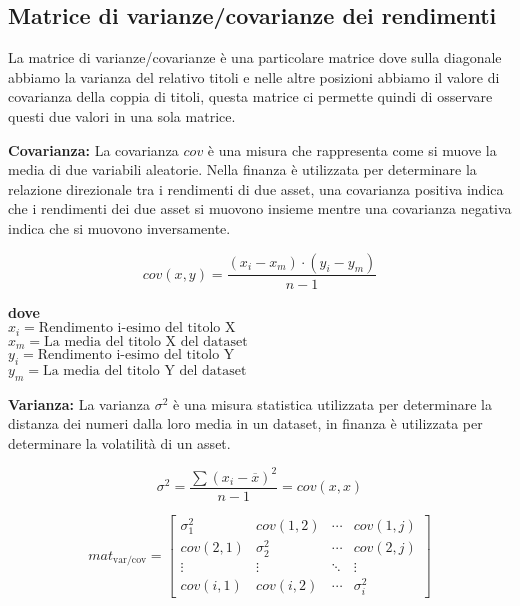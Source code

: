 \pagebreak


\subsection{Matrice di varianze/covarianze dei rendimenti}

La matrice di varianze/covarianze è una particolare matrice dove sulla diagonale abbiamo la varianza del relativo titoli e nelle altre posizioni abbiamo il valore di covarianza
della coppia di titoli, questa matrice ci permette quindi di osservare questi due valori in una sola matrice.

\textbf{Covarianza:} La covarianza \(cov\) è una misura che rappresenta come si muove la media di due variabili aleatorie. Nella finanza è utilizzata per determinare la relazione direzionale
tra i rendimenti di due asset, una covarianza positiva indica che i rendimenti dei due asset si muovono insieme mentre una covarianza negativa indica che si muovono inversamente.

\begin{displaymath}
  cov(x,y) = \frac{(x_i - x_m) \cdot (y_i - y_m)}{n - 1}
\end{displaymath}

\textbf{dove}\\
\(x_i = \text{Rendimento i-esimo del titolo X}\)\\
\(x_m = \text{La media del titolo X del dataset}\)\\
\(y_i = \text{Rendimento i-esimo del titolo Y}\)\\
\(y_m = \text{La media del titolo Y del dataset}\)

\textbf{Varianza:} La varianza \(\sigma^2\) è una misura statistica utilizzata per determinare la distanza dei numeri dalla loro media in un dataset, in finanza è utilizzata
per determinare la volatilità di un asset.

\begin{displaymath}
  \sigma^2 = \frac{\sum(x_i - \overline{x})^2}{n - 1}  = cov(x,x)
\end{displaymath}

\begin{displaymath}
  mat_{\text{var/cov}} = 
\begin{bmatrix}
  \sigma^2_1 & cov(1,2) & \cdots & cov(1,j)\\
  cov(2,1) & \sigma^2_2 & \cdots & cov(2,j)\\
  \vdots   & \vdots   & \ddots & \vdots\\
  cov(i,1) & cov(i,2) & \cdots & \sigma^2_i
\end{bmatrix}
\end{displaymath}

